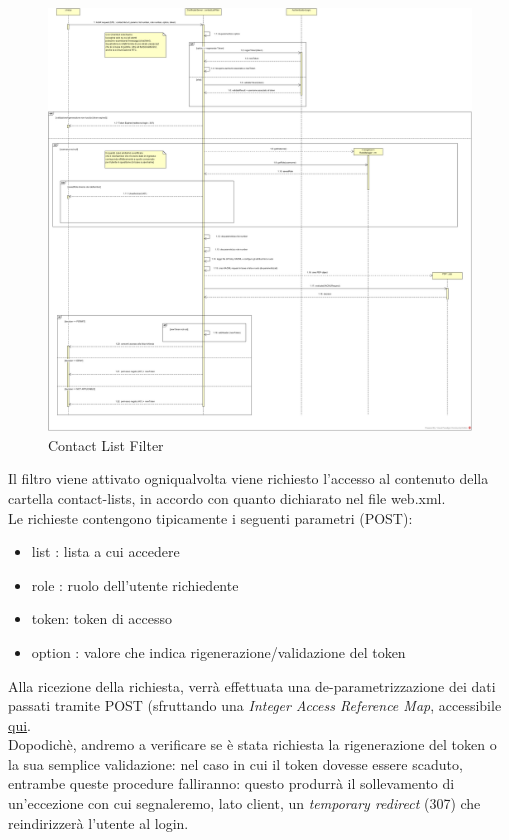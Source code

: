\begin{figure}[!htbp]
		\centering
	\includegraphics[scale = .26]{img/sequence_contactlist.png}
	\caption{Contact List Filter}
	\label{gfx:contactlistfilter}
\end{figure}
Il filtro viene attivato ogniqualvolta viene richiesto l'accesso al contenuto della cartella contact-lists, in accordo con quanto dichiarato nel file web.xml.\\
Le richieste contengono tipicamente i seguenti parametri (POST):
\begin{itemize}
\item list : lista a cui accedere
\item role : ruolo dell'utente richiedente
\item token: token di accesso
\item option : valore che indica rigenerazione/validazione del token
\end{itemize}
Alla ricezione della richiesta, verrà effettuata una de-parametrizzazione dei dati passati tramite POST (sfruttando una \textit{Integer Access Reference Map}, accessibile \href{https://static.javadoc.io/org.owasp.esapi/esapi/2.0.1/org/owasp/esapi/AccessReferenceMap.html}{qui}.\\
Dopodichè, andremo a verificare se è stata richiesta la rigenerazione del token o la sua semplice validazione: nel caso in cui il token dovesse essere scaduto, entrambe queste procedure falliranno: questo produrrà il sollevamento di un'eccezione con cui segnaleremo, lato client, un \textit{temporary redirect} (307) che reindirizzerà l'utente al login.\\
